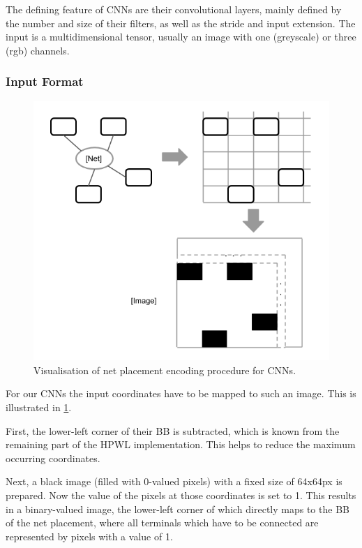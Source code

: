 The defining feature of \glspl{CNN} are their convolutional layers, mainly defined by the number and size of their filters, as well as the stride and input extension. The input is a multidimensional tensor, usually an image with one (greyscale) or three (rgb) channels.

\subsubsection{Input Format}

\begin{figure}
	\includegraphics[width=\linewidth]{plots/cnn-encoding-proper.png}
	\caption{Visualisation of net placement encoding procedure for \glspl{CNN}.}
	\label{fig:cnn-encoding}
\end{figure}

For our \glspl{CNN} the input coordinates have to be mapped to such an image. This is illustrated in \ref{fig:cnn-encoding}.

First, the lower-left corner of their \gls{BB} is subtracted, which is known from the remaining part of the \gls{HPWL} implementation. This helps to reduce the maximum occurring coordinates.

Next, a black image (filled with 0-valued pixels) with a fixed size of 64x64px is prepared. Now the value of the pixels at those coordinates is set to 1. This results in a binary-valued image, the lower-left corner of which directly maps to the \gls{BB} of the net placement, where all terminals which have to be connected are represented by pixels with a value of 1.

